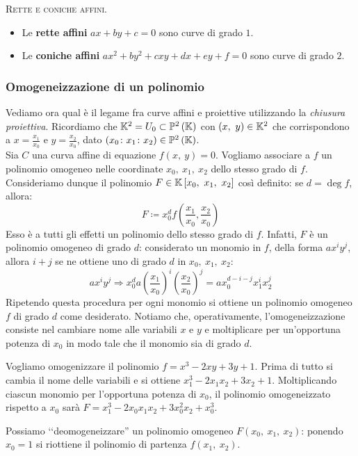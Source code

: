 \begin{define}\textsc{Rette e coniche affini}.
	\begin{itemize}
		\item Le \textbf{rette affini} $ax+by+c=0$ sono curve di grado $1$.
		\item Le \textbf{coniche affini} $ax^2+by^2+cxy+dx+ey+f=0$ sono curve di grado $2$.
	\end{itemize}
	\vspace{-3mm}
\end{define}
\subsubsection{Omogeneizzazione di un polinomio}
Vediamo ora qual è il legame fra curve affini e proiettive utilizzando la \textit{chiusura proiettiva}. Ricordiamo che $\kamp^2=U_0\subset \proj[2]{\kamp}$ con $\left(x,\ y\right)\in\mathbb{K}^2$ che corrispondono a $\displaystyle x=\frac{x_1}{x_0}$ e $\displaystyle y=\frac{x_2}{x_0}$, dato $(x_0\colon x_1\colon x_2)\in\proj[2]{\kamp}$.\\
Sia $C$ una curva affine di equazione $f\left(x,\ y\right)=0$. Vogliamo associare a $f$ un polinomio omogeneo nelle coordinate $x_0,\ x_1,\ x_2$ dello stesso grado di $f$.
Consideriamo dunque il polinomio $F\in\mathbb{K}\left[x_0,\ x_1,\ x_2\right]$ così definito: se $d=\deg f$, allora:
\begin{equation}
	F\coloneqq x_0^d f\left( \frac{x_1}{x_0}, \frac{x_2}{x_0} \right)
\end{equation}
Esso è a tutti gli effetti un polinomio dello stesso grado di $f$. Infatti, $F$ è un polinomio omogeneo di grado $d$: considerato un monomio in $f$, della forma $ax^iy^j$, allora $i+j$ se ne ottiene uno di grado $d$ in $x_0,\ x_1,\ x_2$:
	\begin{equation*}
		ax^iy^j \Longrightarrow x_0^d a \left( \frac{x_1}{x_0} \right)^i \left( \frac{x_2}{x_0} \right)^j = ax_0^{d-i-j} x_1^i x_2^j
	\end{equation*}
Ripetendo questa procedura per ogni monomio si ottiene un polinomio omogeneo $f$ di grado $d$ come desiderato. Notiamo che, operativamente, l'omogeneizzazione consiste nel cambiare nome alle variabili $x$ e $y$ e moltiplicare per un'opportuna potenza di $x_0$ in modo tale che il monomio sia di grado $d$. 
\begin{example} Vogliamo omogenizzare il polinomio $f=x^3-2xy+3y+1$. Prima di tutto si cambia il nome delle variabili e si ottiene $x_1^3-2x_1x_2+3x_2+1$. Moltiplicando ciascun monomio per l'opportuna potenza di $x_0$, il polinomio omogeneizzato rispetto a $x_0$ sarà $F=x_1^3-2x_0x_1x_2 +3x_0^2x_2+x_0^3$.
\end{example}
\begin{observe}
	Possiamo ‘‘deomogeneizzare'' un polinomio omogeneo $F(x_0,\ x_1,\ x_2)$: ponendo $x_0=1$ si riottiene il polinomio di partenza $f(x_1,\ x_2)$.
\end{observe}

